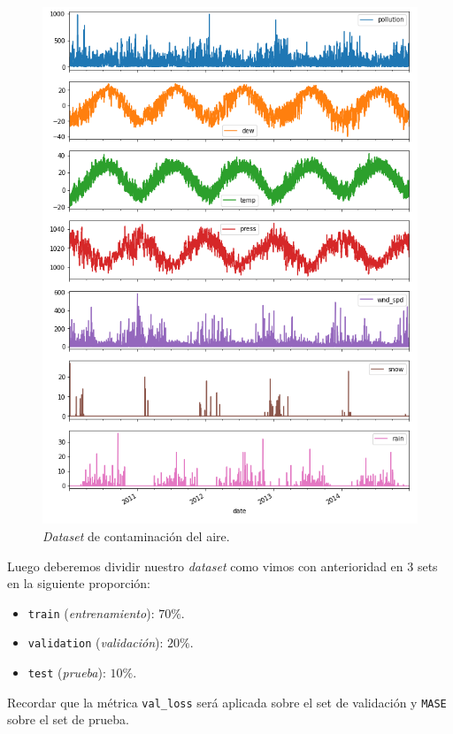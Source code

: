 \documentclass[a4paper,12pt]{article}
\begin{document}
\begin{figure}[H]
	\begin{center}
	\includegraphics[width=1\textwidth]{pollution.png}
  	\caption{\textit{Dataset} de contaminación del aire.}
  	\label{fig:pollution_dataset}
  	\end{center}
\end{figure}

Luego deberemos dividir nuestro \textit{dataset} como vimos con anterioridad en 3 sets en la siguiente proporción:
\begin{itemize}
	\item \texttt{train} (\textit{entrenamiento}): $70\%$.
	\item \texttt{validation} (\textit{validación}): $20\%$.
	\item \texttt{test} (\textit{prueba}): $10\%$.
\end{itemize}

Recordar que la métrica \texttt{val\_loss} será aplicada sobre el set de validación y \texttt{MASE} sobre el set de prueba.
\end{document}
